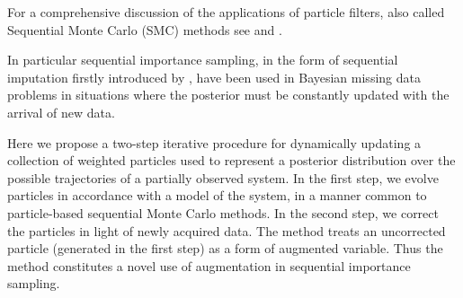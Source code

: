{\color{blue} For a comprehensive discussion of the applications of particle filters, also called Sequential Monte Carlo (SMC) methods see \cite{Cappe} and \cite{Doucet}.}

{\color{blue} In particular sequential importance sampling, in the form of sequential imputation firstly introduced by \cite{Kong}, have been used in Bayesian missing data problems in situations where the posterior must be constantly updated with the arrival of new data.}

Here we propose a two-step iterative procedure for dynamically updating a collection of weighted particles used to represent a posterior distribution over the possible trajectories of a partially observed system. In the first step, we evolve particles in accordance with a model of the system, in a manner common to particle-based sequential Monte Carlo methods. In the second step, we correct the particles in light of newly acquired data. The method treats an uncorrected particle (generated in the first step) as a form of augmented variable. Thus the method constitutes a novel use of augmentation in sequential importance sampling. 

